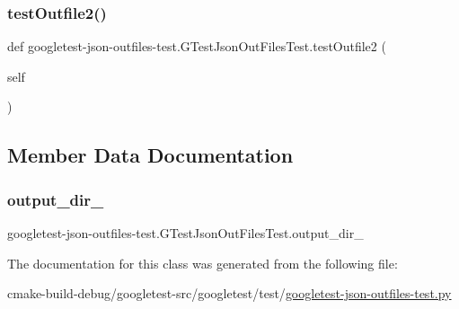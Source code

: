 \subsubsection{\texorpdfstring{testOutfile2()}{testOutfile2()}}
{\footnotesize\ttfamily def googletest-\/json-\/outfiles-\/test.\+G\+Test\+Json\+Out\+Files\+Test.\+test\+Outfile2 (\begin{DoxyParamCaption}\item[{}]{self }\end{DoxyParamCaption})}



\subsection{Member Data Documentation}
\mbox{\label{classgoogletest-json-outfiles-test_1_1GTestJsonOutFilesTest_a18e262639002fb485155961593efad20}} 
\subsubsection{\texorpdfstring{output\_dir\_}{output\_dir\_}}
{\footnotesize\ttfamily googletest-\/json-\/outfiles-\/test.\+G\+Test\+Json\+Out\+Files\+Test.\+output\+\_\+dir\+\_\+}



The documentation for this class was generated from the following file\+:\begin{DoxyCompactItemize}
\item 
cmake-\/build-\/debug/googletest-\/src/googletest/test/\mbox{\hyperlink{googletest-json-outfiles-test_8py}{googletest-\/json-\/outfiles-\/test.\+py}}\end{DoxyCompactItemize}
